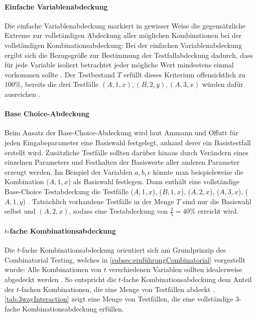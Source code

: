 \paragraph{Einfache Variablenabdeckung}

Die einfache Variablenabdeckung markiert in gewisser Weise die gegensätzliche Extreme zur vollständigen Abdeckung aller möglichen Kombinationen bei der vollständigen Kombinationsabdeckung: Bei der einfachen Variablenabdeckung ergibt sich die Bezugsgröße zur Bestimmung der Testfallabdeckung dadurch, dass für jede Variable isoliert betrachtet jeder mögliche Wert mindestens einmal vorkommen sollte \cite[S. 160 f.]{ammann2008introduction}. Der Testbestand $T$ erfüllt dieses Kriterium offensichtlich zu 100\%, bereits die drei Testfälle $(A, 1, x), (B, 2, y), (A, 3, x)$ würden dafür ausreichen \cite[S. 160 f.]{ammann2008introduction}. 

\paragraph{Base Choice-Abdeckung}

Beim Ansatz der Base-Choice-Abdeckung wird laut Ammann und Offutt \cite[S. 162]{ammann2008introduction} für jeden Eingabeparameter eine Basiswahl festgelegt, anhand derer ein Basistestfall erstellt wird. Zusätzliche Testfälle sollten darüber hinaus durch Verändern eines einzelnen Parameters und Festhalten der Basiswerte aller anderen Parameter erzeugt werden. Im Beispiel der Variablen $a,b,c$ könnte man beispielsweise die Kombination ($A,1,x$) als Basiswahl festlegen. Dann enthält eine vollständige Base-Choice Testabdeckung die Testfälle ($A,1,x$), ($B,1,x$), ($A,2,x$), ($A,3,x$), ($A,1,y$) \cite[S. 162]{ammann2008introduction}. Tatsächlich vorhandene Testfälle in der Menge $T$ sind nur die Basiswahl selbst und $(A,2,x)$, sodass eine Testabdeckung von $\frac{2}{5} = 40 \%$ erreicht wird.

\paragraph{$t$-fache Kombinationsabdeckung}

Die $t$-fache Kombinationsabdeckung orientiert sich am Grundprinzip des Combinatorial Testing, welches in \autoref{subsec:einführungCombinatorial} vorgestellt wurde: Alle Kombinationen von $t$ verschiedenen Variablen sollten idealerweise abgedeckt werden \cite{kuhn2010practical}. So entspricht die $t$-fache Kombinationsabdeckung dem Anteil der $t$-fachen Kombinationen, die eine Menge von Testfällen abdeckt \cite{kuhn2010practical}. \autoref{tab:3wayInteraction} zeigt eine Menge von Testfällen, die eine vollständige 3-fache Kombinationsabdeckung erfüllen.
 
